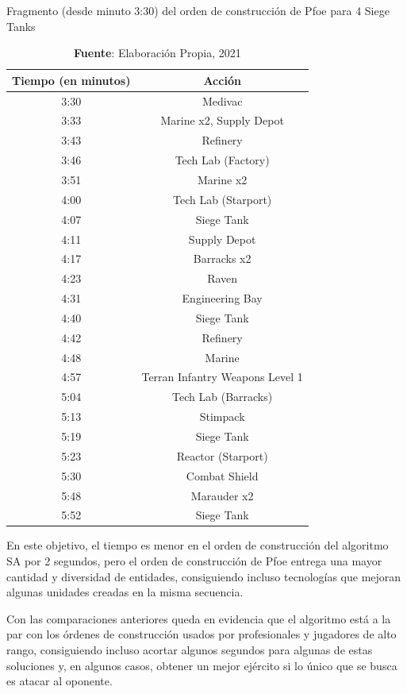 \begin{table}[H]
\centering
\def\arraystretch{1.2}
\captionsetup{justification=centering}
\caption{Fragmento (desde minuto 3:30) del orden de construcción de Pfoe para 4 Siege Tanks}
\label{tab:5.6}
\begin{tabular}{|c|c|}
\hline
\textbf{Tiempo (en minutos)} & \textbf{Acción} \\
\hline
3:30	&  Medivac	 \\ 
3:33	&  Marine x2, Supply Depot	  \\
3:43	&  Refinery	  \\
3:46	&  Tech Lab (Factory)	  \\
3:51	&  Marine x2	  \\
4:00	&  Tech Lab (Starport)	  \\
4:07	&  Siege Tank	  \\
4:11	&  Supply Depot	  \\
4:17	&  Barracks x2	  \\
4:23	&  Raven	  \\
4:31	&  Engineering Bay	  \\
4:40	&  Siege Tank	  \\
4:42	&  Refinery	  \\
4:48	&  Marine	  \\
4:57	&  Terran Infantry Weapons Level 1	  \\
5:04	&  Tech Lab (Barracks)	\\  
5:13	&  Stimpack	  \\
5:19	&  Siege Tank	  \\
5:23	&  Reactor (Starport)	  \\
5:30	&  Combat Shield	  \\
5:48	&  Marauder x2	  \\
5:52	&  Siege Tank \\ \hline
\end{tabular}
\caption*{\textbf{Fuente}: Elaboración Propia, 2021}
\end{table}

En este objetivo, el tiempo es menor en el orden de construcción del algoritmo SA por 2 segundos, pero el orden de construcción de Pfoe entrega una mayor cantidad y diversidad de entidades, consiguiendo incluso tecnologías que mejoran algunas unidades creadas en la misma secuencia.

Con las comparaciones anteriores queda en evidencia que el algoritmo está a la par con los órdenes de construcción usados por profesionales y jugadores de alto rango, consiguiendo incluso acortar algunos segundos para algunas de estas soluciones y, en algunos casos, obtener un mejor ejército si lo único que se busca es atacar al oponente.


